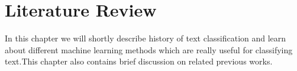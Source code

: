 \documentclass[12pt,a4paper]{report}
\begin{document}






\tableofcontents
\listoffigures
\listoftables
\clearpage
{}

\onehalfspacing



\chapter{Literature Review}
\thispagestyle{empty}
In this chapter we will shortly describe history of text classification and learn about different machine learning methods which are really useful for classifying text.This chapter also contains brief discussion on related previous works.
\end{document}

